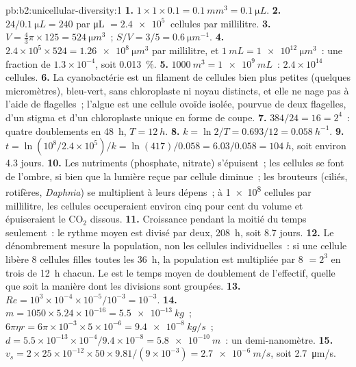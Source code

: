 \begin{solution}{pb:b2:unicellular-diversity:1}
\textbf{1.} $1\times 1\times 0.1 = \qty{0.1}{mm^3} = \qty{0.1}{\micro L}$.
\textbf{2.} $24/\qty{0.1}{\micro L} = 240$ par \unit{\micro L} $=
\qty{2.4e5}{}$ cellules par millilitre.
\textbf{3.} $V = \tfrac{4}{3}\pi\times 125 = \qty{524}{\micro m^3}$~;
$S/V = 3/5 = \qty{0.6}{\micro m^{-1}}$.
\textbf{4.} $2.4\times 10^5\times 524 = \qty{1.26e8}{\micro m^3}$ par
millilitre, et $\qty{1}{mL} = \qty{1e12}{\micro m^3}$~: une fraction de
$1.3\times 10^{-4}$, soit \qty{0.013}{\%}.
\textbf{5.} $\qty{1000}{m^3} = \qty{1e9}{mL}$~: $2.4\times 10^{14}$
cellules.
\textbf{6.} La cyanobactérie est un filament de cellules bien plus
petites (quelques micromètres), bleu-vert, sans chloroplaste ni noyau
distincts, et elle ne nage pas à l'aide de flagelles~; l'algue est une
cellule ovoïde isolée, pourvue de deux flagelles, d'un stigma et d'un
chloroplaste unique en forme de coupe.
\textbf{7.} $384/24 = 16 = 2^4$~: quatre doublements en \qty{48}{h},
$T = \qty{12}{h}$.
\textbf{8.} $k = \ln 2/T = 0.693/12 = \qty{0.058}{h^{-1}}$.
\textbf{9.} $t = \ln(10^8/2.4\times 10^5)/k = \ln(417)/0.058 =
6.03/0.058 = \qty{104}{h}$, soit environ 4.3 jours.
\textbf{10.} Les nutriments (phosphate, nitrate) s'épuisent~; les
cellules se font de l'ombre, si bien que la lumière reçue par cellule
diminue~; les brouteurs (ciliés, rotifères, \emph{Daphnia}) se
multiplient à leurs dépens~; à \qty{1e8}{} cellules par millilitre, les
cellules occuperaient environ cinq pour cent du volume et épuiseraient le
$\mathrm{CO_2}$ dissous.
\textbf{11.} Croissance pendant la moitié du temps seulement~: le
rythme moyen est divisé par deux, \qty{208}{h}, soit 8.7 jours.
\textbf{12.} Le dénombrement mesure la population, non les cellules
individuelles~: si une cellule libère 8 cellules filles toutes les
\qty{36}{h}, la population est multipliée par 8 $= 2^3$ en trois  de \qty{12}{h} chacun. Le  est le temps
moyen de doublement de l'effectif, quelle que soit la manière dont les
divisions sont groupées.
\textbf{13.} $Re = 10^3\times 10^{-4}\times 10^{-5}/10^{-3} = 10^{-3}$.
\textbf{14.} $m = 1050\times 5.24\times 10^{-16} = \qty{5.5e-13}{kg}$~;
$6\pi\eta r = 6\pi\times 10^{-3}\times 5\times 10^{-6} =
\qty{9.4e-8}{kg/s}$~; $d = 5.5\times 10^{-13}\times 10^{-4}/9.4\times
10^{-8} = \qty{5.8e-10}{m}$~: un demi-nanomètre.
\textbf{15.} $v_s = 2\times 25\times 10^{-12}\times 50\times
9.81/(9\times 10^{-3}) = \qty{2.7e-6}{m/s}$, soit \qty{2.7}{\micro m/s}.

\end{solution}
